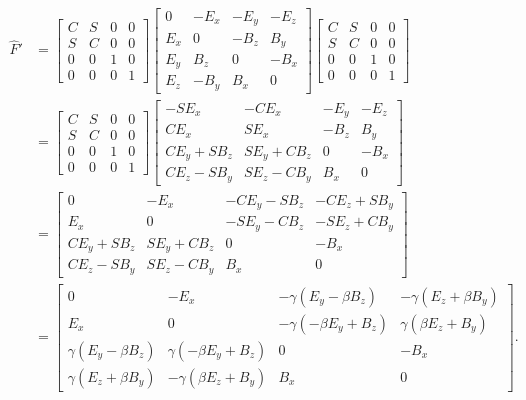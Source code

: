 \begin{align*}
\hat{F}' &=
\begin{bmatrix}
C & S & 0 & 0 \\
S & C & 0 & 0 \\
0 & 0 & 1 & 0 \\
0 & 0 & 0 & 1
\end{bmatrix}
\begin{bmatrix}
0 & -E_x & -E_y & -E_z \\
E_x & 0 & -B_z & B_y \\
E_y & B_z & 0 & -B_x \\
E_z & -B_y & B_x & 0
\end{bmatrix} 
\begin{bmatrix}
C & S & 0 & 0 \\
S & C & 0 & 0 \\
0 & 0 & 1 & 0 \\
0 & 0 & 0 & 1
\end{bmatrix} \\
&=
\begin{bmatrix}
C & S & 0 & 0 \\
S & C & 0 & 0 \\
0 & 0 & 1 & 0 \\
0 & 0 & 0 & 1
\end{bmatrix}
\begin{bmatrix}
- S E_x        & -C E_x        & -E_y  & -E_z \\
C E_x          & S E_x         & -B_z  & B_y \\
C E_y + S B_z  & S E_y + C B_z & 0     & -B_x \\
C E_z - S B_y  & S E_z - C B_y & B_x   & 0 
\end{bmatrix} \\
&=
\begin{bmatrix}
0 & -E_x & -C E_y - S B_z & - C E_z + S B_y \\
E_x & 0 & -S E_y - C B_z & - S E_z + C B_y \\
C E_y + S B_z & S E_y + C B_z & 0 & -B_x \\
C E_z - S B_y & S E_z - C B_y & B_x & 0
\end{bmatrix} \\
&=
\begin{bmatrix}
0 & -E_x & -\gamma(E_y - \beta B_z) & - \gamma(E_z + \beta B_y) \\
E_x & 0 & - \gamma (-\beta E_y + B_z) & \gamma( \beta E_z + B_y) \\
\gamma (E_y - \beta B_z) & \gamma(-\beta E_y + B_z) & 0 & -B_x \\
\gamma (E_z + \beta B_y) & -\gamma(\beta E_z + B_y) & B_x & 0
\end{bmatrix}.
\end{align*}

